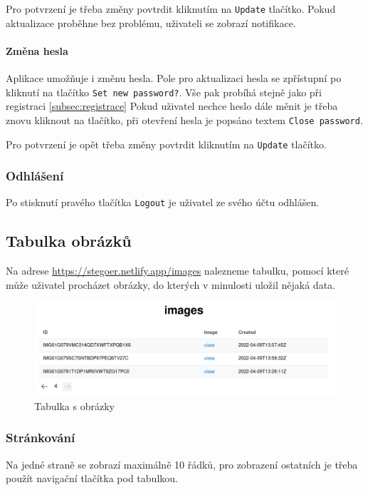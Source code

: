 Pro potvrzení je třeba změny povtrdit kliknutím na \texttt{Update} tlačítko.
Pokud aktualizace proběhne bez problému, uživateli se zobrazí notifikace.

\paragraph{Změna hesla}

Aplikace umožňuje i změnu hesla.
Pole pro aktualizaci hesla se zpřístupní po kliknutí na tlačítko
\texttt{Set new password?}.
Vše pak probíhá stejně jako při registraci \ref{subsec:registrace}
Pokud uživatel nechce heslo dále měnit je třeba znovu kliknout na tlačítko,
při otevření hesla je popsáno textem \texttt{Close password}.

Pro potvrzení je opět třeba změny povtrdit kliknutím na \texttt{Update}
tlačítko.

\subsubsection{Odhlášení}

Po stisknutí pravého tlačítka \texttt{Logout} je uživatel ze svého účtu odhlášen.

\subsection{Tabulka obrázků}\label{subsec:tabulka-obrazku}
Na adrese \url{https://stegoer.netlify.app/images} nalezneme tabulku, pomocí
které může uživatel procházet obrázky, do kterých v minulosti uložil nějaká
data.

\begin{figure}
    \centering
    \includegraphics[scale=0.5]{assets/images/images-table}
    \caption{Tabulka s obrázky}\label{fig:tabulka-obrazky}
\end{figure}

\subsubsection{Stránkování}\label{subsubsec:strankovani}
Na jedné straně se zobrazí maximálně 10 řádků, pro zobrazení ostatních je třeba
použít navigační tlačítka pod tabulkou.


